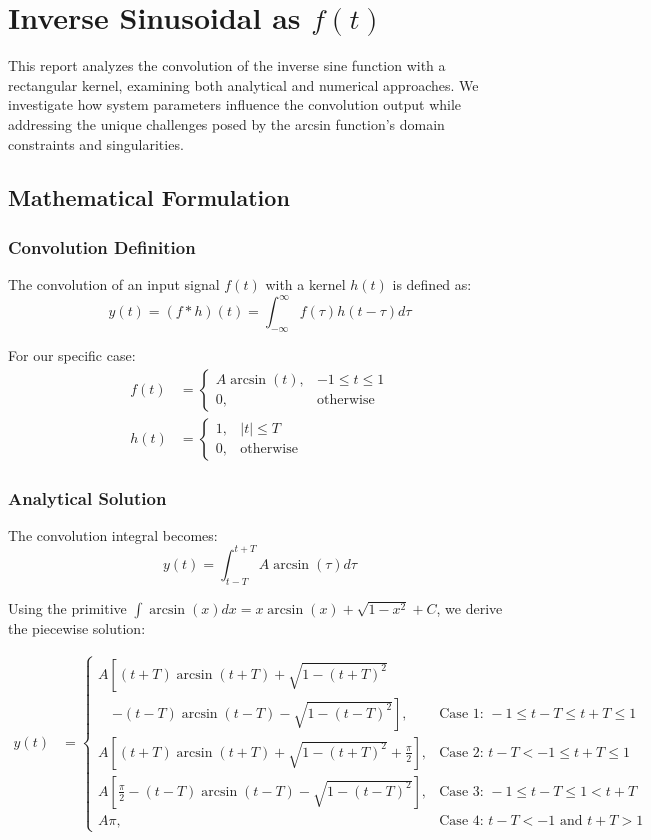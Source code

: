 \section{Inverse Sinusoidal as $f(t)$}
This report analyzes the convolution of the inverse sine function with a rectangular kernel, examining both analytical and numerical approaches. We investigate how system parameters influence the convolution output while addressing the unique challenges posed by the arcsin function's domain constraints and singularities.

\subsection{Mathematical Formulation}

\subsubsection{Convolution Definition}
The convolution of an input signal $f(t)$ with a kernel $h(t)$ is defined as:
\begin{equation}
y(t) = (f * h)(t) = \int_{-\infty}^{\infty} f(\tau)h(t-\tau)d\tau
\end{equation}

For our specific case:
\begin{align}
f(t) &= 
\begin{cases}
A\arcsin(t), & -1 \leq t \leq 1 \\
0, & \text{otherwise}
\end{cases} \\
h(t) &= 
\begin{cases} 
1, & |t| \leq T \\
0, & \text{otherwise}
\end{cases}
\end{align}

\subsubsection{Analytical Solution}
The convolution integral becomes:
\begin{equation}
y(t) = \int_{t-T}^{t+T} A\arcsin(\tau)d\tau
\end{equation}

Using the primitive $\int \arcsin(x)dx = x\arcsin(x) + \sqrt{1-x^2} + C$, we derive the piecewise solution:

\begin{align*}
y(t) &= \begin{cases}
A\left[(t+T)\arcsin(t+T) + \sqrt{1-(t+T)^2}\right. \\
\quad \left.- (t-T)\arcsin(t-T) - \sqrt{1-(t-T)^2}\right], & \text{Case 1: } -1 \leq t-T \leq t+T \leq 1 \\
A\left[(t+T)\arcsin(t+T) + \sqrt{1-(t+T)^2} + \frac{\pi}{2}\right], & \text{Case 2: } t-T < -1 \leq t+T \leq 1 \\
A\left[\frac{\pi}{2} - (t-T)\arcsin(t-T) - \sqrt{1-(t-T)^2}\right], & \text{Case 3: } -1 \leq t-T \leq 1 < t+T \\
A\pi, & \text{Case 4: } t-T < -1 \text{ and } t+T > 1
\end{cases}
\end{align*}

